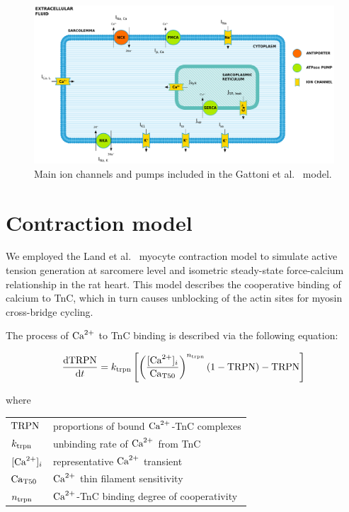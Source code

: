 \begin{figure}[!ht]
    \myfloatalign
    \includegraphics[width=\textwidth]{figures/chapter02/ep.pdf}
    \caption{Main ion channels and pumps included in the Gattoni et al.~\cite{Gattoni:2016} model. }
    \label{fig:gattonicurrentsfig}
\end{figure}




%
%
%
\section{Contraction model}\label{sec:ch2contractionmodel}
We employed the Land et al.~\cite{Land:2012} myocyte contraction model to simulate active tension generation at sarcomere level and isometric steady-state force-calcium relationship in the rat heart. This model describes the cooperative binding of calcium to TnC, which in turn causes unblocking of the actin sites for myosin cross-bridge cycling.

\vspace{0.2cm}
The process of $\textrm{Ca}^{2+}$ to TnC binding is described via the following equation:

\begin{equation}\label{eq:landodesys1}
    \dfrac{\mathrm{d}{\textrm{TRPN}}}{\mathrm{d}{t}} = k_{\textrm{trpn}}\left[\left(\frac{[\textrm{Ca}^{2+}]_{i}}{\textrm{Ca}_{\textrm{T}50}}\right)^{n_{\textrm{trpn}}}(1-\textrm{TRPN})-\textrm{TRPN}\right]
\end{equation}

\noindent
where

\vspace{0.2cm}
\begin{tabular}{ll}
    $\textrm{TRPN}$  & proportions of bound $\textrm{Ca}^{2+}$-TnC complexes \\
    $k_{\textrm{trpn}}$ & unbinding rate of $\textrm{Ca}^{2+}$ from TnC \\
    $[\textrm{Ca}^{2+}]_{i}$   & representative $\textrm{Ca}^{2+}$ transient \\
    $\textrm{Ca}_{\textrm{T}50}$ & $\textrm{Ca}^{2+}$ thin filament sensitivity \\
    $n_{\textrm{trpn}}$ & $\textrm{Ca}^{2+}$-TnC binding degree of cooperativity
\end{tabular}

